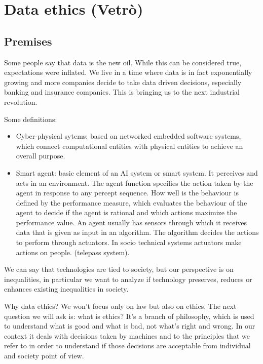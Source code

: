 \section{Data ethics (Vetrò)}
\subsection{Premises}
Some people say that data is the new oil. While this can be considered true, expectations were inflated. We live in a time where data is in fact exponentially growing and more companies decide to take data driven decisions, especially banking and insurance companies. This is bringing us to the next industrial revolution.

Some definitions:
\begin{itemize}
    \item Cyber-physical sytems: based on networked embedded software systems, which connect computational entities with physical entities to achieve an overall purpose.
    \item Smart agent: basic element of an AI system or smart system. It perceives and acts in an environment. The agent function specifies the action taken by the agent in response to any percept sequence. How well is the behaviour is defined by the performance measure, which evaluates the behaviour of the agent to decide if the agent is rational and which actions maximize the performance value. An agent usually has sensors through which it receives data that is given as input in an algorithm. The algorithm decides the actions to perform through actuators. In socio technical systems actuators make actions on people. (telepass system). 
\end{itemize}
We can say that technologies are tied to society, but our perspective is on inequalities, in particular we want to analyze if technology preserves, reduces or enhances existing inequalities in society.

Why data ethics?
We won't focus only on law but also on ethics. The next question we will ask is: what is ethics? It's a branch of philosophy, which is used to understand what is good and what is bad, not what's right and wrong. In our context it deals with decisions taken by machines and to the principles that we refer to in order to understand if those decisions are acceptable from individual and society point of view.

